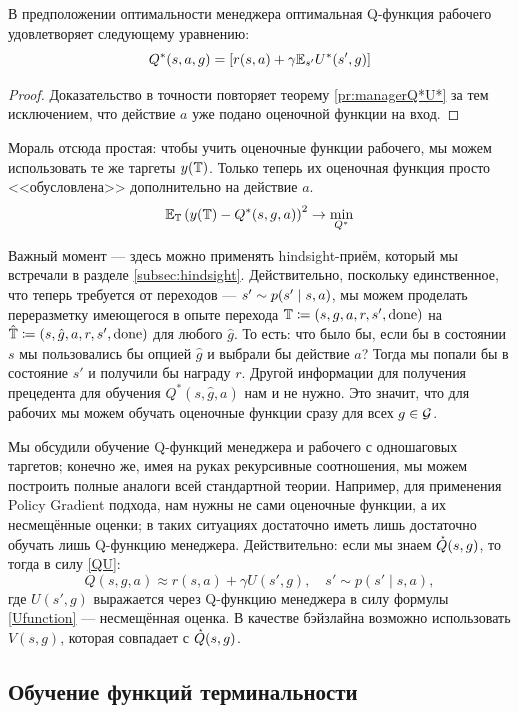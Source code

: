 \begin{proposition}
В предположении оптимальности менеджера оптимальная Q-функция рабочего удовлетворяет следующему уравнению:
$$Q^*(s, a, g) = \left[ r(s, a) + \gamma \mathbb{E}_{s'} U^*(s', g)\right]$$
\begin{proof}
Доказательство в точности повторяет теорему \ref{pr:managerQ*U*} за тем исключением, что действие $a$ уже подано оценочной функции на вход.
\end{proof}
\end{proposition}

Мораль отсюда простая: чтобы учить оценочные функции рабочего, мы можем использовать те же таргеты $y(\mathbb{T})$. Только теперь их оценочная функция просто <<обусловлена>> дополнительно на действие $a$.
$$\mathbb{E}_{\mathbb{T}} \left(y(\mathbb{T}) - Q^*(s, g, a)\right)^2 \to \min_{Q^*}$$

Важный момент --- здесь можно применять hindsight-приём, который мы встречали в разделе \ref{subsec:hindsight}. Действительно, поскольку единственное, что теперь требуется от переходов --- $s' \HM\sim p(s' \HM\mid s, a)$, мы можем проделать переразметку имеющегося в опыте перехода $\mathbb{T} \coloneqq (s, g, a, r, s', \mathrm{done})$ на $\hat{\mathbb{T}} \coloneqq (s, \hat{g}, a, r, s', \mathrm{done})$ для любого $\hat{g}$. То есть: что было бы, если бы в состоянии $s$ мы пользовались бы опцией $\hat{g}$ и выбрали бы действие $a$? Тогда мы попали бы в состояние $s'$ и получили бы награду $r$. Другой информации для получения прецедента для обучения $Q^*(s, \hat{g}, a)$ нам и не нужно. Это значит, что для рабочих мы можем обучать оценочные функции сразу для всех $g \in \mathcal{G}$.

Мы обсудили обучение Q-функций менеджера и рабочего с одношаговых таргетов; конечно же, имея на руках рекурсивные соотношения, мы можем построить полные аналоги всей стандартной теории. Например, для применения Policy Gradient подхода, нам нужны не сами оценочные функции, а их несмещённые оценки; в таких ситуациях достаточно иметь лишь достаточно обучать лишь Q-функцию менеджера. Действительно: если мы знаем $\accentset{\star}{Q}(s, g)$, то тогда в силу \eqref{QU}:
$$Q(s, g, a) \approx r(s, a) + \gamma U(s', g), \quad s' \sim p(s' \mid s, a),$$
где $U(s', g)$ выражается через Q-функцию менеджера в силу формулы \eqref{Ufunction} --- несмещённая оценка. В качестве бэйзлайна возможно использовать $V(s, g)$, которая совпадает с $\accentset{\star}{Q}(s, g)$.

\subsection{Обучение функций терминальности}

